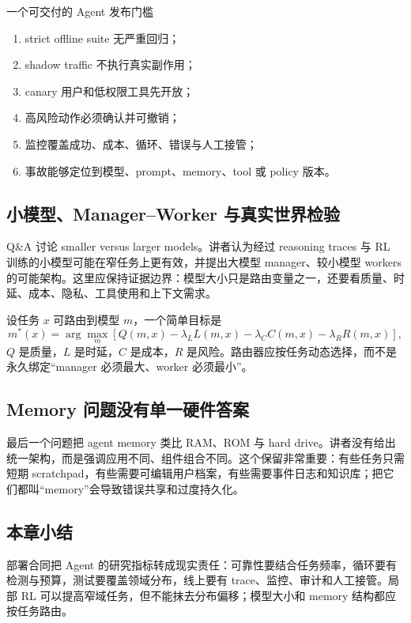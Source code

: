 \begin{importantbox}{一个可交付的 Agent 发布门槛}
\begin{enumerate}
  \item strict offline suite 无严重回归；
  \item shadow traffic 不执行真实副作用；
  \item canary 用户和低权限工具先开放；
  \item 高风险动作必须确认并可撤销；
  \item 监控覆盖成功、成本、循环、错误与人工接管；
  \item 事故能够定位到模型、prompt、memory、tool 或 policy 版本。
\end{enumerate}
\end{importantbox}

\subsection{小模型、Manager--Worker 与真实世界检验}

Q\&A 讨论 smaller versus larger models。讲者认为经过 reasoning traces 与 RL 训练的小模型可能在窄任务上更有效，并提出大模型 manager、较小模型 workers 的可能架构。这里应保持证据边界：模型大小只是路由变量之一，还要看质量、时延、成本、隐私、工具使用和上下文需求。


设任务 $x$ 可路由到模型 $m$，一个简单目标是
\[
m^*(x)=\arg\max_m\left[
Q(m,x)-\lambda_L L(m,x)-\lambda_C C(m,x)-\lambda_R R(m,x)
\right],
\]
$Q$ 是质量，$L$ 是时延，$C$ 是成本，$R$ 是风险。路由器应按任务动态选择，而不是永久绑定“manager 必须最大、worker 必须最小”。

\subsection{Memory 问题没有单一硬件答案}

最后一个问题把 agent memory 类比 RAM、ROM 与 hard drive。讲者没有给出统一架构，而是强调应用不同、组件组合不同。这个保留非常重要：有些任务只需短期 scratchpad，有些需要可编辑用户档案，有些需要事件日志和知识库；把它们都叫“memory”会导致错误共享和过度持久化。


\subsection{本章小结}

部署合同把 Agent 的研究指标转成现实责任：可靠性要结合任务频率，循环要有检测与预算，测试要覆盖领域分布，线上要有 trace、监控、审计和人工接管。局部 RL 可以提高窄域任务，但不能抹去分布偏移；模型大小和 memory 结构都应按任务路由。

